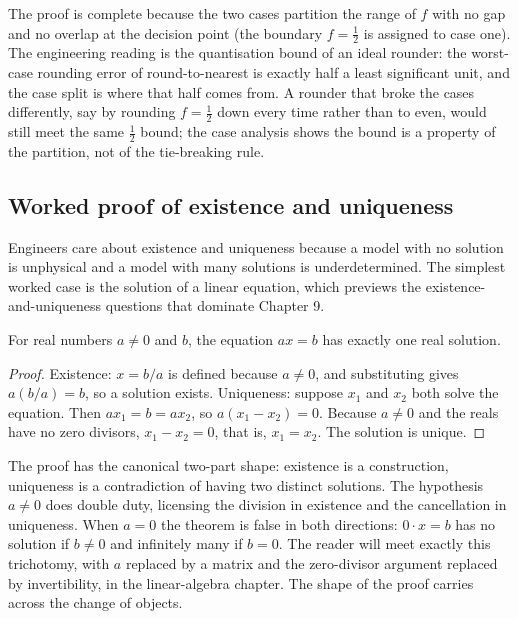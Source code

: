 The proof is complete because the two cases partition the range of $f$
with no gap and no overlap at the decision point (the boundary $f =
\tfrac12$ is assigned to case one). The engineering reading is the
quantisation bound of an ideal rounder: the worst-case rounding error of
round-to-nearest is exactly half a least significant unit, and the case
split is where that half comes from. A rounder that broke the cases
differently, say by rounding $f = \tfrac12$ down every time rather than
to even, would still meet the same $\tfrac12$ bound; the case analysis
shows the bound is a property of the partition, not of the tie-breaking
rule.

\subsection{Worked proof of existence and uniqueness}

Engineers care about existence and uniqueness because a model with no
solution is unphysical and a model with many solutions is
underdetermined. The simplest worked case is the solution of a linear
equation, which previews the existence-and-uniqueness questions that
dominate Chapter 9.

\begin{theorem}
For real numbers $a \neq 0$ and $b$, the equation $a x = b$ has exactly
one real solution.
\end{theorem}

\begin{proof}
Existence: $x = b/a$ is defined because $a \neq 0$, and substituting
gives $a (b/a) = b$, so a solution exists. Uniqueness: suppose
$x_{1}$ and $x_{2}$ both solve the equation. Then $a x_{1} = b =
a x_{2}$, so $a (x_{1} - x_{2}) = 0$. Because $a \neq 0$ and the reals
have no zero divisors, $x_{1} - x_{2} = 0$, that is, $x_{1} = x_{2}$.
The solution is unique.
\end{proof}

The proof has the canonical two-part shape: existence is a
construction, uniqueness is a contradiction of having two distinct
solutions. The hypothesis $a \neq 0$ does double duty, licensing the
division in existence and the cancellation in uniqueness. When $a = 0$
the theorem is false in both directions: $0 \cdot x = b$ has no
solution if $b \neq 0$ and infinitely many if $b = 0$. The reader will
meet exactly this trichotomy, with $a$ replaced by a matrix and the
zero-divisor argument replaced by invertibility, in the linear-algebra
chapter. The shape of the proof carries across the change of objects.

